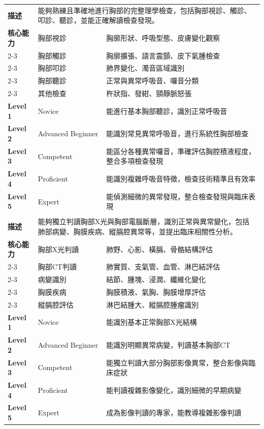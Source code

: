 \documentclass[12pt,a4paper]{article}
\begin{document}
\begin{longtable}{|p{1.5cm}|p{4cm}|p{8.5cm}|}
\rowcolor{emergency_red!10}
\multicolumn{3}{|c|}{\textbf{EPA 2: 胸部理學檢查}} \\
\hline
\textbf{描述} & \multicolumn{2}{|p{12.5cm}|}{能夠熟練且準確地進行胸部的完整理學檢查，包括胸部視診、觸診、叩診、聽診，並能正確解讀檢查發現。} \\
\hline
\textbf{核心能力} & 胸部視診 & 胸廓形狀、呼吸型態、皮膚變化觀察 \\
\cline{2-3}
& 胸部觸診 & 胸廓擴張、語言震顫、皮下氣腫檢查 \\
\cline{2-3}
& 胸部叩診 & 肺界變化、濁音區域識別 \\
\cline{2-3}
& 胸部聽診 & 正常與異常呼吸音、囉音分類 \\
\cline{2-3}
& 其他檢查 & 杵狀指、發紺、頸靜脈怒張 \\
\hline
\textbf{Level 1} & Novice & 能進行基本胸部聽診，識別正常呼吸音 \\
\hline
\textbf{Level 2} & Advanced Beginner & 能識別常見異常呼吸音，進行系統性胸部檢查 \\
\hline
\textbf{Level 3} & Competent & 能區分各種異常囉音，準確評估胸腔積液程度，整合多項檢查發現 \\
\hline
\textbf{Level 4} & Proficient & 能識別複雜呼吸音特徵，檢查技術精準且有效率 \\
\hline
\textbf{Level 5} & Expert & 能偵測細微的異常發現，整合檢查發現與臨床表現 \\
\hline

\rowcolor{emergency_red!10}
\multicolumn{3}{|c|}{\textbf{EPA 3: 胸部影像判讀與分析}} \\
\hline
\textbf{描述} & \multicolumn{2}{|p{12.5cm}|}{能夠獨立判讀胸部X光與胸部電腦斷層，識別正常與異常變化，包括肺部病變、胸膜疾病、縱膈腔異常等，並提出臨床相關性分析。} \\
\hline
\textbf{核心能力} & 胸部X光判讀 & 肺野、心影、橫膈、骨骼結構評估 \\
\cline{2-3}
& 胸部CT判讀 & 肺實質、支氣管、血管、淋巴結評估 \\
\cline{2-3}
& 病變識別 & 結節、腫塊、浸潤、纖維化變化 \\
\cline{2-3}
& 胸膜疾病 & 胸膜積液、氣胸、胸膜增厚評估 \\
\cline{2-3}
& 縱膈腔評估 & 淋巴結腫大、縱膈腔腫瘤識別 \\
\hline
\textbf{Level 1} & Novice & 能識別基本正常胸部X光結構 \\
\hline
\textbf{Level 2} & Advanced Beginner & 能識別明顯異常病變，判讀基本胸部CT \\
\hline
\textbf{Level 3} & Competent & 能獨立判讀大部分胸部影像異常，整合影像與臨床症狀 \\
\hline
\textbf{Level 4} & Proficient & 能判讀複雜影像變化，識別細微的早期病變 \\
\hline
\textbf{Level 5} & Expert & 成為影像判讀的專家，能教導複雜影像判讀 \\
\hline


\end{longtable}
\end{document}
